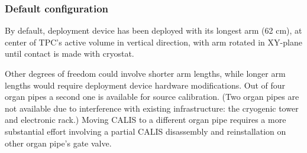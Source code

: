 
\subsubsection{Default configuration}
By default, deployment device has been deployed with its longest arm (62 cm), at center of TPC's active volume in vertical direction, with arm rotated in XY-plane until contact is made with cryostat. 

Other degrees of freedom could involve shorter arm lengths, while longer arm lengths would require deployment device hardware modifications. Out of four organ pipes a second one is available for source calibration. (Two organ pipes are not available due to interference with existing infrastructure: the cryogenic tower and electronic rack.) Moving CALIS to a different organ pipe requires a more substantial effort involving a partial CALIS disassembly and reinstallation on other organ pipe's gate valve.

